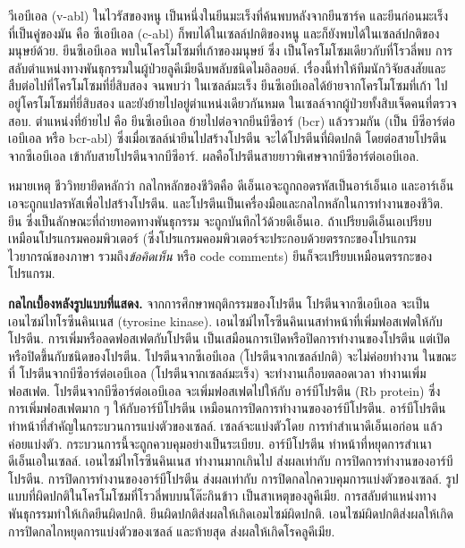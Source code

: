 {\begin{shaded}
	วีเอบีเอล (v-abl) ในไวรัสของหนู เป็นหนึ่งในยีนมะเร็งที่ค้นพบหลังจากยีนซาร์ค
	และยีนก่อนมะเร็ง ที่เป็นคู่ของมัน คือ ซีเอบีเอล (c-abl) ก็พบได้ในเซลล์ปกติของหนู 
	และก็ยังพบได้ในเซลล์ปกติของมนุษย์ด้วย.
	ยีนซีเอบีเอล พบในโครโมโซมที่เก้าของมนุษย์ 
	ซึ่ง เป็นโครโมโซมเดียวกับที่โรวลี่พบ การสลับตำแหน่งทางพันธุกรรมในผู้ป่วยลูคีเมียฉีบพลับชนิดไมอิลอยด์.
	เรื่องนี้ทำให้ทีมนักวิจัยสงสัยและสืบต่อไปที่โครโมโซมที่ยี่สิบสอง 
	จนพบว่า ในเซลล์มะเร็ง ยีนซีเอบีเอลได้ย้ายจากโครโมโซมที่เก้า ไปอยู่โครโมโซมที่ยี่สิบสอง
	และยังย้ายไปอยู่ตำแหน่งเดียวกันหมด ในเซลล์จากผู้ป่วยทั้งสิบเจ็ดคนที่ตรวจสอบ.
	ตำแหน่งที่ย้ายไป คือ 
	ยีนซีเอบีเอล ย้ายไปต่อจากยีนบีซีอาร์ (bcr) แล้วรวมกัน (เป็น บีซีอาร์ต่อเอบีเอล หรือ bcr-abl)
	ซึ่งเมื่อเซลล์นำยีนไปสร้างโปรตีน จะได้โปรตีนที่ผิดปกติ โดยต่อสายโปรตีนจากซีเอบีเอล เข้ากับสายโปรตีนจากบีซีอาร์.
	ผลคือโปรตีนสายยาวพิเศษจากบีซีอาร์ต่อเอบีเอล.
	
	หมายเหตุ ชีววิทยายึดหลักว่า กลไกหลักของชีวิตคือ 
	ดีเอ็นเอจะถูกถอดรหัสเป็นอาร์เอ็นเอ และอาร์เอ็นเอจะถูกแปลรหัสเพื่อไปสร้างโปรตีน.
	และโปรตีนเป็นเครื่องมือและกลไกหลักในการทำงานของชีวิต.
	ยีน ซึ่งเป็นลักษณะที่ถ่ายทอดทางพันธุกรรม จะถูกบันทึกไว้ด้วยดีเอ็นเอ.
	ถ้าเปรียบดีเอ็นเอเปรียบเหมือนโปรแกรมคอมพิวเตอร์ 
	(ซึ่งโปรแกรมคอมพิวเตอร์จะประกอบด้วยตรรกะของโปรแกรม ไวยากรณ์ของภาษา รวมถึง\textit{ข้อคิดเห็น} หรือ code comments)
	ยีนก็จะเปรียบเหมือนตรรกะของโปรแกรม. 
	
	\textbf{กลไกเบื้องหลังรูปแบบที่แสดง.}
	จากการศึกษาพฤติกรรมของโปรตีน
	โปรตีนจากซีเอบีเอล จะเป็นเอนไซม์ไทโรซีนคินเนส (tyrosine kinase).
	เอนไซม์ไทโรซีนคินเนสทำหน้าที่เพิ่มฟอสเฟตให้กับโปรตีน.
	การเพิ่มหรือลดฟอสเฟตกับโปรตีน เป็นเสมือนการเปิดหรือปิดการทำงานของโปรตีน แต่เปิดหรือปิดขึ้นกับชนิดของโปรตีน.
	โปรตีนจากซีเอบีเอล (โปรตีนจากเซลล์ปกติ) จะไม่ค่อยทำงาน
	ในขณะที่ โปรตีนจากบีซีอาร์ต่อเอบีเอล (โปรตีนจากเซลล์มะเร็ง)
	จะทำงานเกือบตลอดเวลา ทำงานเพิ่มฟอสเฟต. 
	โปรตีนจากบีซีอาร์ต่อเอบีเอล จะเพิ่มฟอสเฟตไปให้กับ อาร์บีโปรตีน (Rb protein)
	ซึ่ง การเพิ่มฟอสเฟตมาก ๆ ให้กับอาร์บีโปรตีน เหมือนการปิดการทำงานของอาร์บีโปรตีน.
	อาร์บีโปรตีน ทำหน้าที่สำคัญในกระบวนการแบ่งตัวของเซลล์.
	เซลล์จะแบ่งตัวโดย การทำสำเนาดีเอ็นเอก่อน แล้วค่อยแบ่งตัว.
	กระบวนการนี้จะถูกควบคุมอย่างเป็นระเบียบ.
	อาร์บีโปรตีน ทำหน้าที่หยุดการสำเนาดีเอ็นเอในเซลล์. %
เอนไซม์ไทโรซีนคินเนส ทำงานมากเกินไป 
ส่งผลเท่ากับ การปิดการทำงานของอาร์บีโปรตีน.
	การปิดการทำงานของอาร์บีโปรตีน ส่งผลเท่ากับ
	การปิดกลไกควบคุมการแบ่งตัวของเซลล์.
	รูปแบบที่ผิดปกติในโครโมโซมที่โรวลี่พบบนโต๊ะกินข้าว เป็นสาเหตุของลูคีเมีย. 
	การสลับตำแหน่งทางพันธุกรรมทำให้เกิดยีนผิดปกติ.
	ยีนผิดปกติส่งผลให้เกิดเอมไซม์ผิดปกติ.
	เอนไซม์ผิดปกติส่งผลให้เกิดการปิดกลไกหยุดการแบ่งตัวของเซลล์
	และท้ายสุด ส่งผลให้เกิดโรคลูคีเมีย.
	

\end{shaded}}

